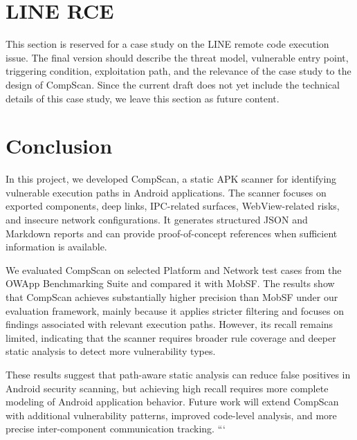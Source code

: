\documentclass[sigconf, nonacm]{acmart}
\begin{document}
\section{LINE RCE}

This section is reserved for a case study on the LINE remote code execution issue. The final version should describe the threat model, vulnerable entry point, triggering condition, exploitation path, and the relevance of the case study to the design of CompScan. Since the current draft does not yet include the technical details of this case study, we leave this section as future content.

\section{Conclusion}

In this project, we developed CompScan, a static APK scanner for identifying vulnerable execution paths in Android applications. The scanner focuses on exported components, deep links, IPC-related surfaces, WebView-related risks, and insecure network configurations. It generates structured JSON and Markdown reports and can provide proof-of-concept references when sufficient information is available.

We evaluated CompScan on selected Platform and Network test cases from the OWApp Benchmarking Suite and compared it with MobSF. The results show that CompScan achieves substantially higher precision than MobSF under our evaluation framework, mainly because it applies stricter filtering and focuses on findings associated with relevant execution paths. However, its recall remains limited, indicating that the scanner requires broader rule coverage and deeper static analysis to detect more vulnerability types.

These results suggest that path-aware static analysis can reduce false positives in Android security scanning, but achieving high recall requires more complete modeling of Android application behavior. Future work will extend CompScan with additional vulnerability patterns, improved code-level analysis, and more precise inter-component communication tracking.
```
\end{document}
